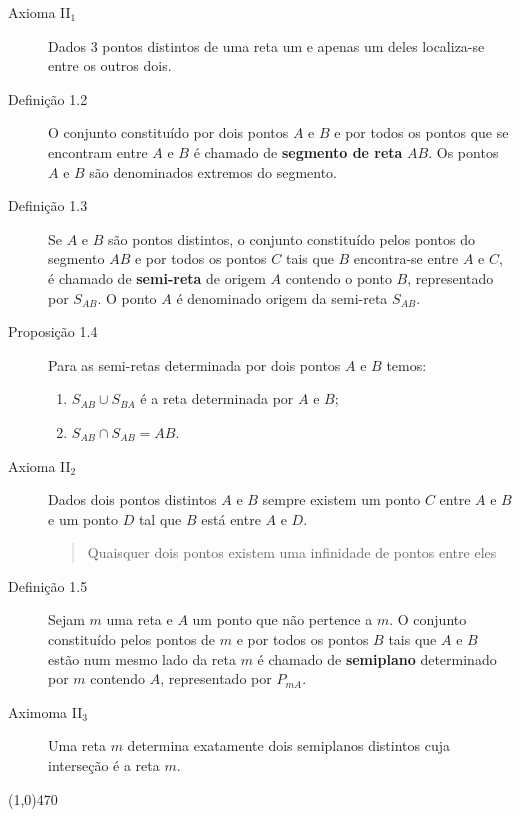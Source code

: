 \begin{description}
  \item[Axioma II$_{1}$] Dados 3 pontos distintos de uma reta um e apenas
    um deles localiza-se entre os outros dois.
  \item[Definição 1.2] O conjunto constituído por dois pontos $A$ e $B$ e por
    todos os pontos que se encontram entre $A$ e $B$ é chamado de
    \textbf{segmento de reta} $AB$. Os pontos $A$ e $B$ são denominados
    extremos do segmento.
  \item[Definição 1.3] Se $A$ e $B$ são pontos distintos, o conjunto
    constituído pelos pontos do segmento $AB$ e por todos os pontos $C$ tais
    que
    $B$ encontra-se entre $A$ e $C$, é chamado de \textbf{semi-reta} de
    origem $A$ contendo o ponto $B$, representado por $S_{AB}$. O ponto $A$ é
    denominado origem da semi-reta $S_{AB}$.
  \item[Proposição 1.4] Para as semi-retas determinada por dois pontos $A$ e
    $B$ temos:

  \begin{enumerate} \itemsep1pt \parskip0pt 
    \item $S_{AB} \cup S_{BA}$ é a reta determinada por $A$ e $B$;
    \item $S_{AB} \cap S_{AB} = AB$.
  \end{enumerate}

  \item[Axioma II$_{2}$] Dados dois pontos distintos $A$ e $B$ sempre existem
    um ponto $C$ entre $A$ e $B$ e um ponto $D$ tal que $B$ está entre $A$ e
    $D$.

  \begin{quote}
    Quaisquer dois pontos existem uma infinidade de pontos entre eles
  \end{quote}

  \item[Definição 1.5] Sejam $m$ uma reta e $A$ um ponto que não pertence a
    $m$. O conjunto constituído pelos pontos de $m$ e por todos os pontos $B$
    tais que $A$ e $B$ estão num mesmo lado da reta $m$ é chamado de
    \textbf{semiplano} determinado por $m$ contendo $A$, representado por
    $P_{mA}$.

  \item[Aximoma II$_{3}$] Uma reta $m$ determina exatamente dois semiplanos
    distintos cuja interseção é a reta $m$.
\end{description}

\line(1,0){470}

